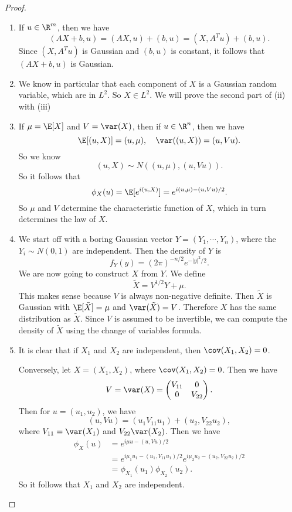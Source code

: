 \documentclass[a4paper]{article}
\begin{document}
\begin{proof}\leavevmode
  \begin{enumerate}
    \item If $u \in \R^m$, then we have
      \[
        (AX + b, u) = (AX, u) + (b, u) = (X, A^T u) + (b, u).
      \]
      Since $(X, A^T u)$ is Gaussian and $(b, u)$ is constant, it follows that $(AX + b, u)$ is Gaussian.
    \item We know in particular that each component of $X$ is a Gaussian random variable, which are in $L^2$. So $X \in L^2$. We will prove the second part of (ii) with (iii)
    \item If $\mu = \E[X]$ and $V = \var(X)$, then if $u \in \R^n$, then we have
      \[
        \E[(u, X)] = (u, \mu),\quad \var((u, X)) = (u, Vu).
      \]
      So we know
      \[
        (u, X) \sim N((u, \mu), (u, Vu)).
      \]
      So it follows that
      \[
        \phi_X(u) = \E[e^{i(u, X)}] = e^{i(u, \mu) - (u, Vu)/2}.
      \]
      So $\mu$ and $V$ determine the characteristic function of $X$, which in turn determines the law of $X$.
    \item We start off with a boring Gaussian vector $Y = (Y_1, \cdots, Y_n)$, where the $Y_i \sim N(0, 1)$ are independent. Then the density of $Y$ is
      \[
        f_Y(y) = (2\pi)^{-n/2} e^{-|y|^2/2}.
      \]
      We are now going to construct $X$ from $Y$. We define
      \[
        \tilde{X} = V^{1/2} Y + \mu.
      \]
      This makes sense because $V$ is always non-negative definite. Then $\tilde{X}$ is Gaussian with $\E[\tilde{X}] = \mu$ and $\var(\tilde{X}) = V$. Therefore $X$ has the same distribution as $\tilde{X}$. Since $V$ is assumed to be invertible, we can compute the density of $\tilde{X}$ using the change of variables formula.
    \item It is clear that if $X_1$ and $X_2$ are independent, then $\cov(X_1, X_2) = 0$.

      Conversely, let $X = (X_1, X_2)$, where $\cov(X_1, X_2) = 0$. Then we have
      \[
        V = \var(X) =
        \begin{pmatrix}
          V_{11} & 0\\
          0 & V_{22}
        \end{pmatrix}.
      \]
      Then for $u = (u_1, u_2)$, we have
      \[
        (u, Vu) = (u_1 V_{11} u_1) + (u_2, V_{22}u_2),
      \]
      where $V_{11} = \var(X_1)$ and $V_{22} \var(X_2)$. Then we have
      \begin{align*}
        \phi_X(u) &= e^{i\mu u - (u, Vu)/2}\\
        &= e^{i\mu_1 u_1 - (u_1, V_{11}u_1)/2} e^{i\mu_2 u_2 - (u_2, V_{22}u_2)/2}\\
        &= \phi_{X_1}(u_1)\phi_{X_2} (u_2).
      \end{align*}
      So it follows that $X_1$ and $X_2$ are independent.\qedhere
  \end{enumerate}
\end{proof}
\end{document}
